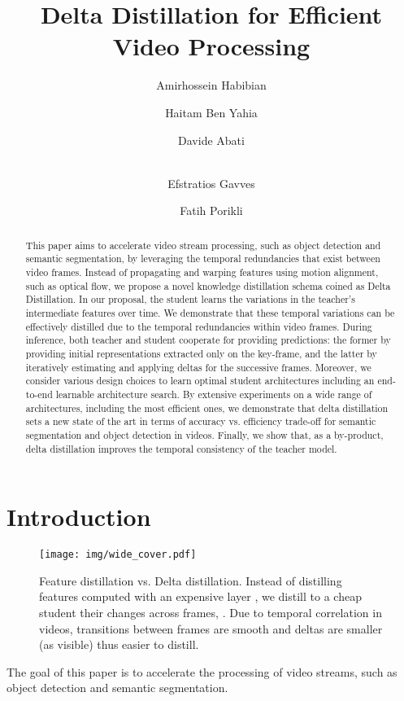 \documentclass[runningheads]{llncs}
\begin{document}
\pagestyle{headings}
\mainmatter
\title{Delta Distillation for Efficient Video Processing}
\author{
Amirhossein Habibian
\and Haitam Ben Yahia
\and Davide Abati\and\\
Efstratios Gavves
\and Fatih Porikli
}
\maketitle
\begin{abstract}
This paper aims to accelerate video stream processing, such as object detection and semantic segmentation, by leveraging the temporal redundancies that exist between video frames. Instead of propagating and warping features using motion alignment, such as optical flow, we propose a novel knowledge distillation schema coined as Delta Distillation.
In our proposal, the student learns the variations in the teacher's intermediate features over time. We demonstrate that these temporal variations can be effectively distilled due to the temporal redundancies within video frames.
During inference, both teacher and student cooperate for providing predictions: the former by providing initial representations extracted only on the key-frame, and the latter by iteratively estimating and applying deltas for the successive frames.
Moreover, we consider various design choices to learn optimal student architectures including an end-to-end learnable architecture search.
By extensive experiments on a wide range of architectures, including the most efficient ones, we demonstrate that delta distillation sets a new state of the art in terms of accuracy vs. efficiency trade-off for semantic segmentation and object detection in videos. Finally, we show that, as a by-product, delta distillation improves the temporal consistency of the teacher model.
\end{abstract} \section{Introduction}
\label{sec:introduction}
\begin{figure}[t]
\centering
\texttt{[image: img/wide\_cover.pdf]}
\caption{Feature distillation vs. Delta distillation. Instead of distilling features  computed with an expensive layer , we distill to a cheap student  their changes across frames, . Due to temporal correlation in videos, transitions between frames are smooth and deltas are smaller (as visible) thus easier to distill.}
\vspace{-4mm}
\label{fig:cover_fig}
\end{figure} The goal of this paper is to accelerate the processing of video streams, such as object detection and semantic segmentation. 
\end{document}
